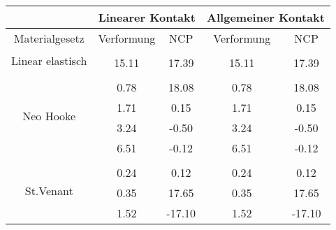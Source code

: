 \begin{table} 
\centering 
\begin{tabular}{c|cc|cc|} 
\cline{2-5} 
 & \multicolumn{2}{|c|}{Linearer Kontakt} & \multicolumn{2}{|c|}{Allgemeiner Kontakt} \\ 
\hline 
\multicolumn{1}{|c|}{Materialgesetz} & \multicolumn{1}{c|}{Verformung} & \multicolumn{1}{c|}{NCP} & \multicolumn{1}{c|}{Verformung} & \multicolumn{1}{c|}{NCP} \\ 
\hline 
\multicolumn{1}{|c|}{\multirow{2}{*}{Linear elastisch}} &\multicolumn{1}{|c|}{} & \multicolumn{1}{|c|}{} & \multicolumn{1}{|c|}{} & \multicolumn{1}{|c|}{} \\ 
\multicolumn{1}{|c|}{} & \multicolumn{1}{|c|}{     15.11} & \multicolumn{1}{|c|}{     17.39} & \multicolumn{1}{|c|}{     15.11} & \multicolumn{1}{|c|}{     17.39} \\ 
\hline 
\multicolumn{1}{|c|}{\multirow{5}{*}{Neo Hooke}} &\multicolumn{1}{|c|}{} & \multicolumn{1}{|c|}{} & \multicolumn{1}{|c|}{} & \multicolumn{1}{|c|}{} \\ 
\multicolumn{1}{|c|}{} & \multicolumn{1}{|c|}{      0.78} & \multicolumn{1}{|c|}{     18.08} & \multicolumn{1}{|c|}{      0.78} & \multicolumn{1}{|c|}{     18.08} \\ 
\multicolumn{1}{|c|}{} & \multicolumn{1}{|c|}{      1.71} & \multicolumn{1}{|c|}{      0.15} & \multicolumn{1}{|c|}{      1.71} & \multicolumn{1}{|c|}{      0.15} \\ 
\multicolumn{1}{|c|}{} & \multicolumn{1}{|c|}{      3.24} & \multicolumn{1}{|c|}{     -0.50} & \multicolumn{1}{|c|}{      3.24} & \multicolumn{1}{|c|}{     -0.50} \\ 
\multicolumn{1}{|c|}{} & \multicolumn{1}{|c|}{      6.51} & \multicolumn{1}{|c|}{     -0.12} & \multicolumn{1}{|c|}{      6.51} & \multicolumn{1}{|c|}{     -0.12} \\ 
\hline 
\multicolumn{1}{|c|}{\multirow{7}{*}{St.Venant}} &\multicolumn{1}{|c|}{} & \multicolumn{1}{|c|}{} & \multicolumn{1}{|c|}{} & \multicolumn{1}{|c|}{} \\ 
\multicolumn{1}{|c|}{} & \multicolumn{1}{|c|}{      0.24} & \multicolumn{1}{|c|}{      0.12} & \multicolumn{1}{|c|}{      0.24} & \multicolumn{1}{|c|}{      0.12} \\ 
\multicolumn{1}{|c|}{} & \multicolumn{1}{|c|}{      0.35} & \multicolumn{1}{|c|}{     17.65} & \multicolumn{1}{|c|}{      0.35} & \multicolumn{1}{|c|}{     17.65} \\ 
\multicolumn{1}{|c|}{} & \multicolumn{1}{|c|}{      1.52} & \multicolumn{1}{|c|}{    -17.10} & \multicolumn{1}{|c|}{      1.52} & \multicolumn{1}{|c|}{    -17.10} \\ 

\end{tabular}
\end{table}

